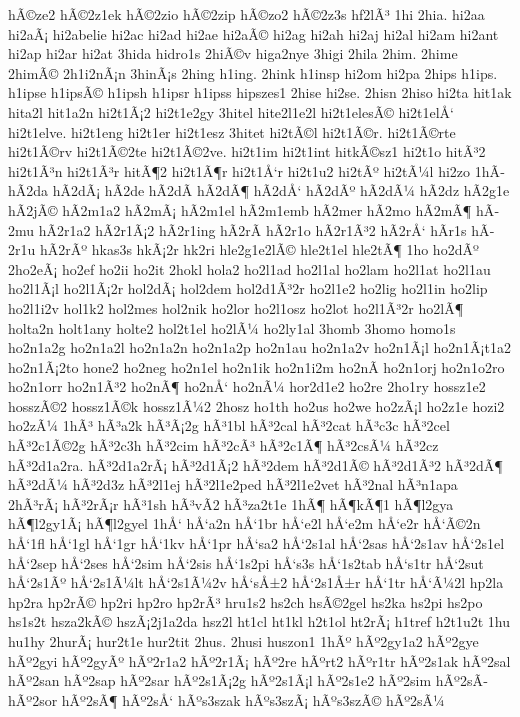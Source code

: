 {hÃ©ze2
hÃ©2z1ek
hÃ©2zio
hÃ©2zip
hÃ©zo2
hÃ©2z3s
hf2lÃ³
1hi
2hia.
hi2aa
hi2aÃ¡
hi2abelie
hi2ac
hi2ad
hi2ae
hi2aÃ©
hi2ag
hi2ah
hi2aj
hi2al
hi2am
hi2ant
hi2ap
hi2ar
hi2at
3hida
hidro1s
2hiÃ©v
higa2nye
3higi
2hila
2him.
2hime
2himÃ©
2h1i2nÃ¡n
3hinÃ¡s
2hing
h1ing.
2hink
h1insp
hi2om
hi2pa
2hips
h1ips.
h1ipse
h1ipsÃ©
h1ipsh
h1ipsr
h1ipss
hipszes1
2hise
hi2se.
2hisn
2hiso
hi2ta
hit1ak
hita2l
hit1a2n
hi2t1Ã¡2
hi2t1e2gy
3hitel
hite2l1e2l
hi2t1elesÃ©
hi2t1elÅ‘
hi2t1elve.
hi2t1eng
hi2t1er
hi2t1esz
3hitet
hi2tÃ©l
hi2t1Ã©r.
hi2t1Ã©rte
hi2t1Ã©rv
hi2t1Ã©2te
hi2t1Ã©2ve.
hi2t1im
hi2t1int
hitkÃ©sz1
hi2t1o
hitÃ³2
hi2t1Ã³n
hi2t1Ã³r
hitÃ¶2
hi2t1Ã¶r
hi2t1Å‘r
hi2t1u2
hi2tÃº
hi2tÃ¼l
hi2zo
1hÃ­
hÃ­2da
hÃ­2dÃ¡
hÃ­2de
hÃ­2dÃ­
hÃ­2dÃ¶
hÃ­2dÅ‘
hÃ­2dÃº
hÃ­2dÃ¼
hÃ­2dz
hÃ­2g1e
hÃ­2jÃ©
hÃ­2m1a2
hÃ­2mÃ¡
hÃ­2m1el
hÃ­2m1emb
hÃ­2mer
hÃ­2mo
hÃ­2mÃ¶
hÃ­2mu
hÃ­2r1a2
hÃ­2r1Ã¡2
hÃ­2r1ing
hÃ­2rÃ­
hÃ­2r1o
hÃ­2r1Ã³2
hÃ­2rÅ‘
hÃ­r1s
hÃ­2r1u
hÃ­2rÃº
hkas3s
hkÃ¡2r
hk2ri
hle2g1e2lÃ©
hle2t1el
hle2tÃ¶
1ho
ho2dÃº
2ho2eÃ¡
ho2ef
ho2ii
ho2it
2hokl
hola2
ho2l1ad
ho2l1al
ho2lam
ho2l1at
ho2l1au
ho2l1Ã¡l
ho2l1Ã¡2r
hol2dÃ¡
hol2dem
hol2d1Ã³2r
ho2l1e2
ho2lig
ho2l1in
ho2lip
ho2l1i2v
hol1k2
hol2mes
hol2nik
ho2lor
ho2l1osz
ho2lot
ho2l1Ã³2r
ho2lÃ¶
holta2n
holt1any
holte2
hol2t1el
ho2lÃ¼
ho2ly1al
3homb
3homo
homo1s
ho2n1a2g
ho2n1a2l
ho2n1a2n
ho2n1a2p
ho2n1au
ho2n1a2v
ho2n1Ã¡l
ho2n1Ã¡t1a2
ho2n1Ã¡2to
hone2
ho2neg
ho2n1el
ho2n1ik
ho2n1i2m
ho2nÃ­
ho2n1orj
ho2n1o2ro
ho2n1orr
ho2n1Ã³2
ho2nÃ¶
ho2nÅ‘
ho2nÃ¼
hor2d1e2
ho2re
2ho1ry
hossz1e2
hosszÃ©2
hossz1Ã©k
hossz1Ã¼2
2hosz
ho1th
ho2us
ho2we
ho2zÃ¡l
ho2z1e
hozi2
ho2zÃ¼
1hÃ³
hÃ³a2k
hÃ³Ã¡2g
hÃ³1bl
hÃ³2cal
hÃ³2cat
hÃ³c3c
hÃ³2cel
hÃ³2c1Ã©2g
hÃ³2c3h
hÃ³2cim
hÃ³2cÃ³
hÃ³2c1Ã¶
hÃ³2csÃ¼
hÃ³2cz
hÃ³2d1a2ra.
hÃ³2d1a2rÃ¡
hÃ³2d1Ã¡2
hÃ³2dem
hÃ³2d1Ã©
hÃ³2d1Ã³2
hÃ³2dÃ¶
hÃ³2dÃ¼
hÃ³2d3z
hÃ³2l1ej
hÃ³2l1e2ped
hÃ³2l1e2vet
hÃ³2nal
hÃ³n1apa
2hÃ³rÃ¡
hÃ³2rÃ¡r
hÃ³1sh
hÃ³vÃ­2
hÃ³za2t1e
1hÃ¶
hÃ¶kÃ¶1
hÃ¶l2gya
hÃ¶l2gy1Ã¡
hÃ¶l2gyel
1hÅ‘
hÅ‘a2n
hÅ‘1br
hÅ‘e2l
hÅ‘e2m
hÅ‘e2r
hÅ‘Ã©2n
hÅ‘1fl
hÅ‘1gl
hÅ‘1gr
hÅ‘1kv
hÅ‘1pr
hÅ‘sa2
hÅ‘2s1al
hÅ‘2sas
hÅ‘2s1av
hÅ‘2s1el
hÅ‘2sep
hÅ‘2ses
hÅ‘2sim
hÅ‘2sis
hÅ‘1s2pi
hÅ‘s3s
hÅ‘1s2tab
hÅ‘s1tr
hÅ‘2sut
hÅ‘2s1Ãº
hÅ‘2s1Ã¼lt
hÅ‘2s1Ã¼2v
hÅ‘sÅ±2
hÅ‘2s1Å±r
hÅ‘1tr
hÅ‘Ã¼2l
hp2la
hp2ra
hp2rÃ©
hp2ri
hp2ro
hp2rÃ³
hru1s2
hs2ch
hsÃ©2gel
hs2ka
hs2pi
hs2po
hs1s2t
hsza2kÃ©
hszÃ¡2j1a2da
hsz2l
ht1cl
ht1kl
h2t1ol
ht2rÃ¡
h1tref
h2t1u2t
1hu
hu1hy
2hurÃ¡
hur2t1e
hur2tit
2hus.
2husi
huszon1
1hÃº
hÃº2gy1a2
hÃº2gye
hÃº2gyi
hÃº2gyÃº
hÃº2r1a2
hÃº2r1Ã¡
hÃº2re
hÃºrt2
hÃºr1tr
hÃº2s1ak
hÃº2sal
hÃº2san
hÃº2sap
hÃº2sar
hÃº2s1Ã¡2g
hÃº2s1Ã¡l
hÃº2s1e2
hÃº2sim
hÃº2sÃ­
hÃº2sor
hÃº2sÃ¶
hÃº2sÅ‘
hÃºs3szak
hÃºs3szÃ¡
hÃºs3szÃ©
hÃº2sÃ¼
}
